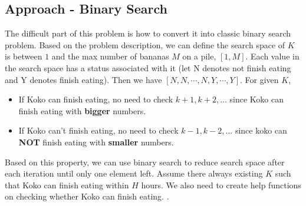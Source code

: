 \documentclass[justified]{tufte-book}
\begin{document}
\subsection{Approach - Binary Search}
The difficult part of this problem is how to convert it into classic binary search problem. Based on the problem description, we can define the search space of $K$ is between $1$ and the max number of bananas $M$ on a pile, $[1, M]$.  Each value in the search space has a status associated with it (let N denotes not finish eating and Y denotes finish eating). Then we have $[N, N, \cdots, N, Y, \cdots, Y]$. For given $K$, 
\begin{itemize}
    \item If Koko can finish eating, no need to check $k+1, k+2, ...$ since Koko can finish eating with \textbf{bigger} numbers.
    \item If Koko can't finish eating, no need to check $k-1, k-2, ...$ since koko can \textbf{NOT} finish eating with \textbf{smaller} numbers. 
\end{itemize}
Based on this property, we can use binary search to reduce search space after each iteration until only one element left. Assume there always existing $K$ such that Koko can finish eating within $H$ hours. We also need to create help functions on checking whether Koko can finish eating. .
\end{document}
